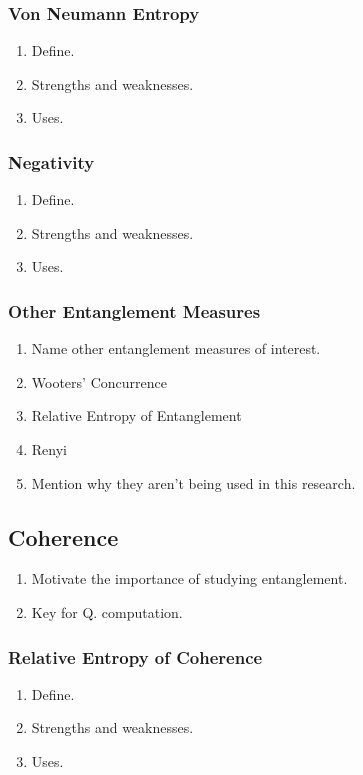\documentclass{article}
\begin{document}
\subsubsection{Von Neumann Entropy}
\begin{enumerate}
    \item Define.
    \item Strengths and weaknesses.
    \item Uses.
\end{enumerate}
\subsubsection{Negativity}
\begin{enumerate}
    \item Define.
    \item Strengths and weaknesses.
    \item Uses.
\end{enumerate}
\subsubsection{Other Entanglement Measures}
\begin{enumerate}
    \item Name other entanglement measures of interest.
    \item Wooters' Concurrence
    \item Relative Entropy of Entanglement 
    \item Renyi 
    \item Mention why they aren't being used in this research. 
\end{enumerate}
\subsection{Coherence}
\begin{enumerate}
    \item Motivate the importance of studying entanglement. 
    \item Key for Q. computation.
\end{enumerate}
\subsubsection{Relative Entropy of Coherence}
\begin{enumerate}
    \item Define.
    \item Strengths and weaknesses.
    \item Uses.
\end{enumerate}
\end{document}
